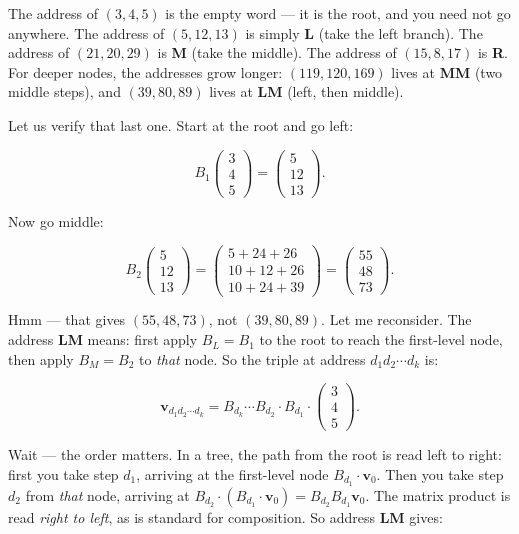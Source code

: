 The address of \((3, 4, 5)\) is the empty word --- it is the root, and you need not go anywhere. The address of \((5, 12, 13)\) is simply \textbf{L} (take the left branch). The address of \((21, 20, 29)\) is \textbf{M} (take the middle). The address of \((15, 8, 17)\) is \textbf{R}. For deeper nodes, the addresses grow longer: \((119, 120, 169)\) lives at \textbf{MM} (two middle steps), and \((39, 80, 89)\) lives at \textbf{LM} (left, then middle).

Let us verify that last one. Start at the root and go left:

\[B_1 \begin{pmatrix} 3 \\ 4 \\ 5 \end{pmatrix} = \begin{pmatrix} 5 \\ 12 \\ 13 \end{pmatrix}.\]

Now go middle:

\[B_2 \begin{pmatrix} 5 \\ 12 \\ 13 \end{pmatrix} = \begin{pmatrix} 5 + 24 + 26 \\ 10 + 12 + 26 \\ 10 + 24 + 39 \end{pmatrix} = \begin{pmatrix} 55 \\ 48 \\ 73 \end{pmatrix}.\]

Hmm --- that gives \((55, 48, 73)\), not \((39, 80, 89)\). Let me reconsider. The address \textbf{LM} means: first apply \(B_L = B_1\) to the root to reach the first-level node, then apply \(B_M = B_2\) to \emph{that} node. So the triple at address \(d_1 d_2 \cdots d_k\) is:

\[\mathbf{v}_{d_1 d_2 \cdots d_k} = B_{d_k} \cdots B_{d_2} \cdot B_{d_1} \cdot \begin{pmatrix} 3 \\ 4 \\ 5 \end{pmatrix}.\]

Wait --- the order matters. In a tree, the path from the root is read left to right: first you take step \(d_1\), arriving at the first-level node \(B_{d_1} \cdot \mathbf{v}_0\). Then you take step \(d_2\) from \emph{that} node, arriving at \(B_{d_2} \cdot (B_{d_1} \cdot \mathbf{v}_0) = B_{d_2} B_{d_1} \mathbf{v}_0\). The matrix product is read \emph{right to left}, as is standard for composition. So address \textbf{LM} gives:

